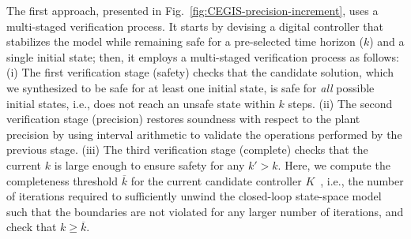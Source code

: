 \documentclass[10pt,conference]{IEEEtran}
\begin{document}
The first approach, presented in Fig.~\ref{fig:CEGIS-precision-increment}, 
uses a multi-staged verification process. 
It starts by devising a digital controller that stabilizes the model while remaining safe for a
pre-selected time horizon ($k$) and a single initial state; then, it
employs a multi-staged verification process as follows:
(i) The first verification stage ({\sc safety}) checks that the candidate
solution, which we synthesized to be safe for at least one initial
state, is safe for \emph{all} possible initial states, i.e., does not reach
an unsafe state within $k$ steps.
(ii) The second verification stage ({\sc precision})
 restores soundness with respect to the plant precision
by using interval arithmetic \cite{moore1966interval} to validate the 
operations performed by the previous stage. 
(iii) The third verification stage ({\sc complete}) checks that the current
$k$ is large enough to ensure safety for any $k'{>}k$.  Here, we compute the
completeness threshold $\overline{k}$ for the current candidate controller 
$K$~\cite{abatecav2017}, i.e., the number of
iterations required to sufficiently unwind the closed-loop state-space
model such that the boundaries are not violated for any larger number of
iterations, and
check that $k{\geq}\overline{k}$.
%
\end{document}
